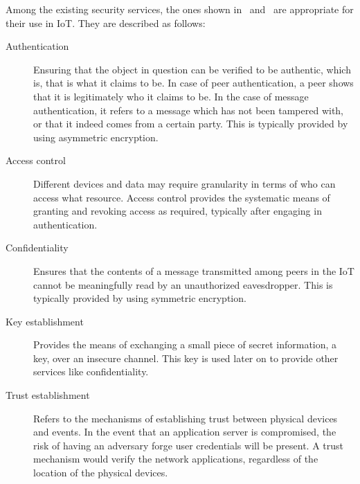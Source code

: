 \documentclass[12pt]{article}
\begin{document}
Among the existing security services, the ones shown in~\cite{HELLAOUI2017173} and~\cite{ALABA201710} are appropriate for their use in IoT. They are described as follows: 

\begin{description}
\item [Authentication] Ensuring that the object in question can be verified to be authentic, which is, that is what it claims to be. In case of peer authentication, a peer shows that it is legitimately who it claims to be. In the case of message authentication, it refers to a message which has not been tampered with, or that it indeed comes from a certain party. This is typically provided by using asymmetric encryption.
\item [Access control] Different devices and data may require granularity in terms of who can access what resource. Access control provides the systematic means of granting and revoking access as required, typically after engaging in authentication.
\item [Confidentiality] Ensures that the contents of a message transmitted among peers in the IoT cannot be meaningfully read by an unauthorized eavesdropper. This is typically provided by using symmetric encryption.
\item [Key establishment] Provides the means of exchanging a small piece of secret information, a key, over an insecure channel. This key is used later on to provide other services like confidentiality.
\item [Trust establishment] Refers to the mechanisms of establishing trust between physical devices and events. In the event that an application server is compromised, the risk of having an adversary forge user credentials will be present. A trust mechanism would verify the network applications, regardless of the location of the physical devices. 
\end{description}
\end{document}
